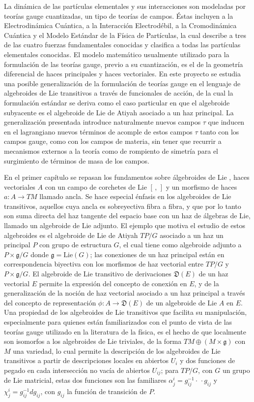 La dinámica de las partículas elementales y sus interacciones son modeladas por teorías gauge cuantizadas, un tipo de teorías de campos. Éstas incluyen a la Electrodinámica Cuántica, a la Interacción Electrodébil, a la Cromodinámica Cuántica y el Modelo Estándar de la Física de Partículas, la cual describe a tres de las cuatro fuerzas fundamentales conocidas y clasifica a todas las partículas elementales conocidas. El modelo matemático usualmente utilizado para la formulación de las teorías gauge, previo a su cuantización, es el de la geometría diferencial de haces principales y haces vectoriales. En este proyecto se estudia una posible generalización de la formulación de teorías gauge en el lenguaje de algebroides de Lie transitivos a través de funcionales de acción, de la cual la formulación estándar se deriva como el caso particular en que el algebroide subyacente es el algebroide de Lie de Atiyah asociado a un haz principal. La generalización presentada introduce naturalmente nuevos campos $\tau$ que inducen en el lagrangiano nuevos términos de acomple de estos campos $\tau$ tanto con los campos gauge, como con los campos de materia, sin tener que recurrir a mecanismos externos a la teoría como de rompiento de simetría para el surgimiento de términos de masa de los campos.

En el primer capítulo se repasan los fundamentos sobre álgebroides de Lie
, haces vectoriales $A$ con un campo de corchetes de Lie $[\,,\,]$ y un morfismo de haces $a:A \to TM$ llamado ancla. Se hace especial énfasis en los algebroides de Lie transitivos, aquellos cuya ancla es sobreyectiva fibra a fibra, y que por lo tanto son suma directa del haz tangente del espacio base con un haz de álgebras de Lie, llamado un algebroide de Lie adjunto. El ejemplo que motiva el estudio de estos algebroides es el algebroide de Lie de Atiyah $TP/G$ asociado a un haz un principal $P$ con grupo de estructura $G$, el cual tiene como algebroide adjunto a $P \times \mathfrak g/G$ donde $\mathfrak g = \text{Lie}(G)$; las conexiones de un haz principal están en correspondencia biyectiva con los morfismos de haz vectorial entre $TP/G$ y $P \times \mathfrak g/G$. El algebroide de Lie transitivo de derivaciones $\mathfrak D(E)$ de un haz vectorial $E$ permite la expresión del concepto de conexión en $E$, y de la generalización de la noción de haz vectorial asociado a un haz principal a través del concepto de representación $\phi: A \to \mathfrak D(E)$ de un algebroide de Lie $A$ en $E$. Una propiedad de los algebroides de Lie transitivos que facilita su manipulación, especialmente para quienes están familiarizados con el punto de vista de las teorías gauge utilizado en la literatura de la física, es el hecho de que localmente son isomorfos a los algebroides de Lie triviales, de la forma $TM\oplus (M \times \mathfrak g)$ con $M$ una variedad, lo cual permite la descripción de los algebroides de Lie transitivos a partir de descripciones locales en abiertos $U_i$ y dos funciones de pegado en cada intersección no vacía de abiertos $U_{ij}$; para $TP/G$, con $G$ un grupo de Lie matricial, estas dos funciones son las familiares $\alpha^i_j = g^{-1}_{ij}\cdot \, \cdot g_{ij}$ y $\chi^i_j = g_{ij}^{-1} dg_{ij}$, con $g_{ij}$ la función de transición de $P$.

